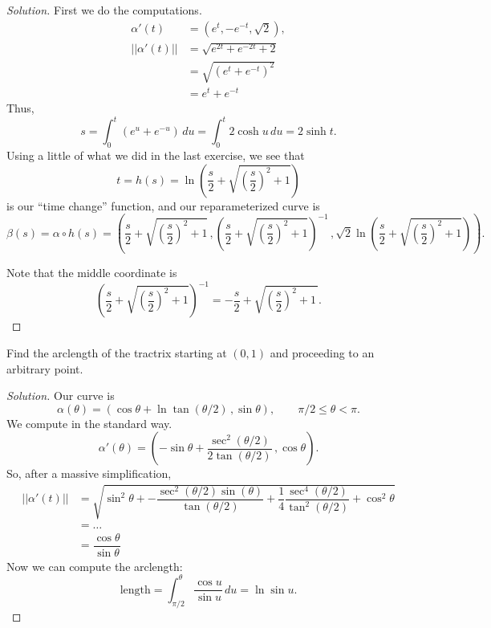 \documentclass[Shifrin_Solutions_Spring_2018]{subfiles}
\begin{document}
\begin{proof}[Solution]
First we do the computations.
\begin{align*}
\alpha'(t) & = \left( e^t , -e^{-t} , \sqrt{2} \right) , \\
||\alpha'(t) || & =\sqrt{ e^{2t} + e^{-2t} + 2} \\
& = \sqrt{( e^t + e^{-t}  )^2} \\
& = e^t + e^{-t}
\end{align*}
Thus,
\[
s = \int_0^t (e^u + e^{-u} ) \, du = \int_0^t 2\cosh u \, du = 2 \sinh t.
\]
Using a little of what we did in the last exercise, we see that
\[
t = h(s) = \ln\left( \dfrac{s}{2} + \sqrt{\left(\dfrac{s}{2}\right)^2 + 1 } \right)
\]
is our ``time change'' function, and our reparameterized curve is
\[
\beta(s) = \alpha\circ h(s) = \left(
 \dfrac{s}{2} + \sqrt{\left(\dfrac{s}{2}\right)^2 + 1 } \, ,
\left( \dfrac{s}{2} + \sqrt{\left(\dfrac{s}{2}\right)^2 + 1 }\right)^{-1} \, ,
\sqrt{2}\ln\left(\dfrac{s}{2} + \sqrt{ \left(\dfrac{s}{2}\right)^2+1 } \right) \right) .
\]

Note that the middle coordinate is
\[
\left(\dfrac{s}{2} + \sqrt{\left(\dfrac{s}{2}\right)^2 + 1 }\right)^{-1} =  - \dfrac{s}{2} + \sqrt{\left(\dfrac{s}{2}\right)^2 + 1\, }  .
\]

\end{proof}

\vspace{.5cm}



\begin{exercise}
Find the arclength of the tractrix starting at $(0,1)$ and proceeding to an arbitrary point.
\end{exercise}

\begin{proof}[Solution]
Our curve is
\[
\alpha(\theta) = \left( \cos \theta + \ln \tan( \theta/2 )\, , \sin\theta \right) , \qquad \pi/2 \leq \theta < \pi .
\]
We compute in the standard way.
\[
\alpha'(\theta) = \left( -\sin\theta + \dfrac{\sec^2(\theta/2)}{2\tan(\theta/2)}\, , \cos\theta \right) .
\]
So, after a massive simplification,
\[
\begin{split}
||\alpha'(t) ||  & = \sqrt{  \sin^2\theta + -\dfrac{\sec^2(\theta/2)\sin(\theta)}{\tan(\theta/2)} + \dfrac{1}{4}\dfrac{\sec^4(\theta/2)}{\tan^2(\theta/2)} + \cos^2\theta   } \\
& = \ldots \\
& =   \dfrac{\cos \theta}{\sin\theta}
\end{split}
\]
Now we can compute the arclength:
\[
\text{length} = \int_{\pi/2}^{\theta} \dfrac{\cos u}{\sin u} \, du = \ln \sin u .
\]
\end{proof}
\end{document}
